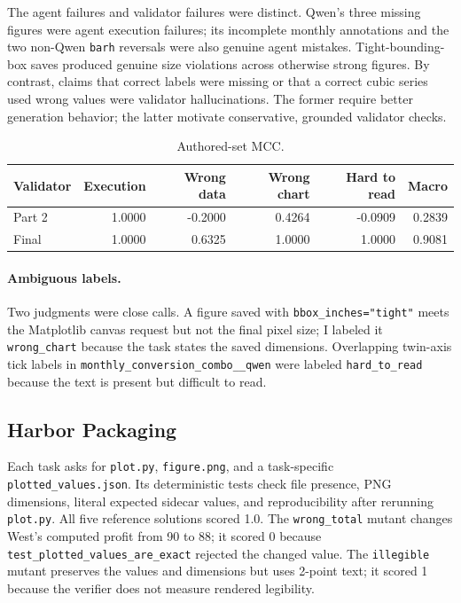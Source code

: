\documentclass[11pt]{article}
\begin{document}
The agent failures and validator failures were distinct. Qwen's three missing
figures were agent execution failures; its incomplete monthly annotations and
the two non-Qwen \texttt{barh} reversals were also genuine agent mistakes.
Tight-bounding-box saves produced genuine size violations across otherwise
strong figures. By contrast, claims that correct labels were missing or that a
correct cubic series used wrong values were validator hallucinations. The
former require better generation behavior; the latter motivate conservative,
grounded validator checks.

\begin{table}[h]
\centering
\caption{Authored-set MCC.}
\label{tab:authored}
\begin{tabular}{lrrrrr}
\toprule
Validator & Execution & Wrong data & Wrong chart & Hard to read & Macro \\
\midrule
Part 2 & 1.0000 & -0.2000 & 0.4264 & -0.0909 & 0.2839 \\
Final & 1.0000 & 0.6325 & 1.0000 & 1.0000 & 0.9081 \\
\bottomrule
\end{tabular}
\end{table}

\paragraph{Ambiguous labels.} Two judgments were close calls. A figure saved with
\texttt{bbox\_inches="tight"} meets the Matplotlib canvas request but not the final pixel size; I labeled it
\texttt{wrong\_chart} because the task states the saved dimensions. Overlapping twin-axis tick labels in
\texttt{monthly\_conversion\_combo\_\_qwen} were labeled \texttt{hard\_to\_read} because the text is present but difficult to read.

\subsection{Harbor Packaging}
Each task asks for \texttt{plot.py}, \texttt{figure.png}, and a task-specific
\texttt{plotted\_values.json}. Its deterministic tests check file presence,
PNG dimensions, literal expected sidecar values, and reproducibility after
rerunning \texttt{plot.py}. All five reference solutions scored 1.0.
The \texttt{wrong\_total} mutant changes West's computed profit from 90 to 88;
it scored 0 because \texttt{test\_plotted\_values\_are\_exact} rejected the changed value. The
\texttt{illegible} mutant preserves the values and dimensions but uses 2-point
text; it scored 1 because the verifier does not measure rendered legibility.
\end{document}
